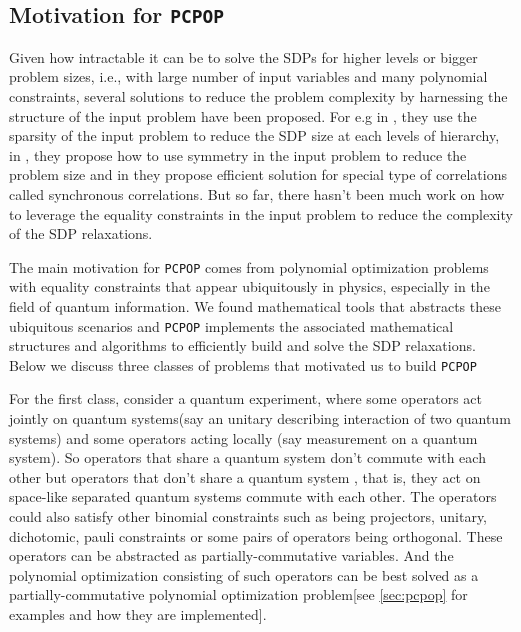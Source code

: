 \subsection{Motivation for \texttt{PCPOP}}
\label{sec:motivation}
Given how intractable it can be to solve the SDPs for higher levels or bigger problem sizes, i.e., with large number of input variables and many polynomial constraints, several solutions to reduce the problem complexity by harnessing the structure of the input problem have been proposed. For e.g in \cite{doi:10.1137/19M1307871}, they use the sparsity of the input problem to reduce the SDP size at each levels of hierarchy, in \cite{rosset2018symdpolysymmetryadaptedmomentrelaxations} , they propose how to use symmetry in the input problem to reduce the problem size and in \cite{russell2023synchronousnpahierarchyapplications} they propose efficient solution for special type of correlations called synchronous correlations. But so far, there hasn't been much work on how to leverage the equality constraints in the input problem to reduce the complexity of the SDP relaxations.

The main motivation for \texttt{PCPOP} comes from polynomial optimization problems with equality constraints that appear ubiquitously in physics, especially in the field of quantum information. We found mathematical tools that abstracts these ubiquitous scenarios and \texttt{PCPOP} implements the associated mathematical structures and algorithms to efficiently build and solve the SDP relaxations. Below we discuss three classes of problems that motivated us to build \texttt{PCPOP}\@

For the first class, consider a quantum experiment, where some operators act jointly on quantum systems(say an unitary describing interaction of two quantum systems) and some operators acting locally (say measurement on a quantum system). So operators that share a quantum system don't commute with each other but operators that don't share a quantum system , that is, they act on space-like separated  quantum systems commute with each other. The operators could also satisfy other binomial constraints such as being projectors, unitary, dichotomic, pauli constraints or some pairs of operators being orthogonal.  These operators can be abstracted as partially-commutative variables. And the polynomial optimization consisting of such operators can be best solved as a partially-commutative polynomial optimization problem[see \ref{sec:pcpop} for examples and how they are implemented]. 


